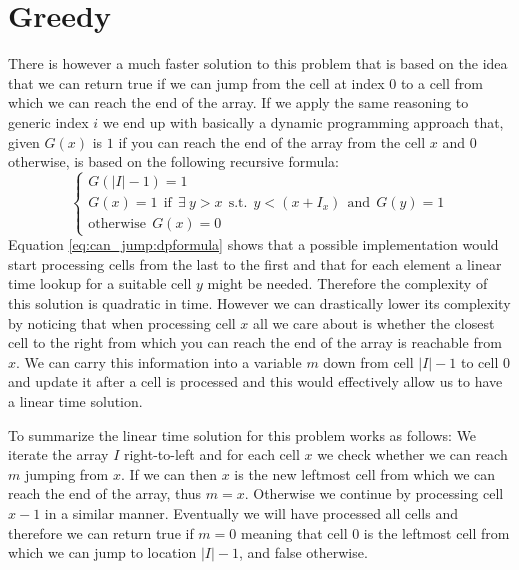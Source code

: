 \section{Greedy}
\label{can_jump:sec:greedy}
There is however a much faster solution to this problem that is based on the idea that we can return
true if we can jump from the cell at index $0$ to a cell from which we can reach the end of the
array. If we apply the same reasoning to generic index $i$ we end up with basically a dynamic
programming approach that, given $G(x)$ is $1$ if you can reach the end of the array from the cell
$x$ and $0$ otherwise, is based on the following recursive formula:
\begin{equation}
	\begin{cases}
		G(|I|-1) = 1 \\
		G(x) = 1 \: \: \text{if} \: \: \exists \: y > x \:\: \text{s.t.} \:\: y < (x+I_x) \: \: \text{and} \: \:G(y) = 1\\
		\text{otherwise} \: \: G(x) = 0
	 \end{cases}
	\label{eq:can_jump:dpformula}
\end{equation}
Equation \ref{eq:can_jump:dpformula} shows that a possible implementation would start processing
cells from the last to the first and that for each element a linear time lookup for a suitable cell
$y$ might be needed. Therefore the complexity of this solution is quadratic in time. However we can
drastically lower its complexity by noticing that when processing cell $x$ all we care about is
whether the closest cell to the right from which you can reach the end of the array is reachable
from $x$. We can carry this information into a variable $m$ down from cell $|I|-1$ to cell $0$ and
update it after a cell is processed and this would effectively allow us to have a linear time
solution.

To summarize the linear time solution for this problem works as follows: We iterate the array $I$
right-to-left and for each cell $x$ we check whether we can reach $m$ jumping from $x$. If we can
then $x$ is the new leftmost cell from which we can reach the end of the array, thus $m = x$.
Otherwise we continue by processing cell $x-1$ in a similar manner. Eventually we will have
processed all cells and therefore we can return true if $m = 0$ meaning that cell $0$ is the
leftmost cell from which we can jump to location $|I|-1$, and false otherwise.


